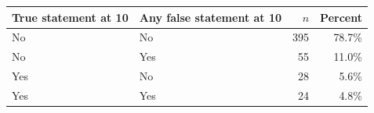\begin{tabular}{llrr}
\toprule
True statement at 10 & Any false statement at 10 & $n$ & Percent \\
\midrule
No & No & 395 & 78.7\% \\
No & Yes &  55 & 11.0\% \\
Yes & No &  28 & 5.6\% \\
Yes & Yes &  24 & 4.8\% \\
\bottomrule
\end{tabular}
